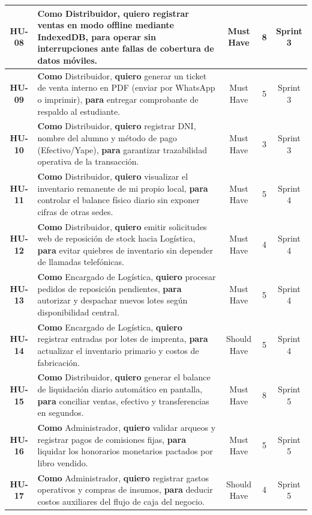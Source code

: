 \begin{xltabular}{\textwidth}{|c|X|c|c|c|}
\hline
\textbf{HU-08} & \textbf{Como} Distribuidor, \textbf{quiero} registrar ventas en modo offline mediante IndexedDB, \textbf{para} operar sin interrupciones ante fallas de cobertura de datos móviles. & Must Have & 8 & Sprint 3 \\
\hline
\textbf{HU-09} & \textbf{Como} Distribuidor, \textbf{quiero} generar un ticket de venta interno en PDF (enviar por WhatsApp o imprimir), \textbf{para} entregar comprobante de respaldo al estudiante. & Must Have & 5 & Sprint 3 \\
\hline
\textbf{HU-10} & \textbf{Como} Distribuidor, \textbf{quiero} registrar DNI, nombre del alumno y método de pago (Efectivo/Yape), \textbf{para} garantizar trazabilidad operativa de la transacción. & Must Have & 3 & Sprint 3 \\
\hline
\textbf{HU-11} & \textbf{Como} Distribuidor, \textbf{quiero} visualizar el inventario remanente de mi propio local, \textbf{para} controlar el balance físico diario sin exponer cifras de otras sedes. & Must Have & 5 & Sprint 4 \\
\hline
\textbf{HU-12} & \textbf{Como} Distribuidor, \textbf{quiero} emitir solicitudes web de reposición de stock hacia Logística, \textbf{para} evitar quiebres de inventario sin depender de llamadas telefónicas. & Must Have & 4 & Sprint 4 \\
\hline
\textbf{HU-13} & \textbf{Como} Encargado de Logística, \textbf{quiero} procesar pedidos de reposición pendientes, \textbf{para} autorizar y despachar nuevos lotes según disponibilidad central. & Must Have & 5 & Sprint 4 \\
\hline
\textbf{HU-14} & \textbf{Como} Encargado de Logística, \textbf{quiero} registrar entradas por lotes de imprenta, \textbf{para} actualizar el inventario primario y costos de fabricación. & Should Have & 5 & Sprint 4 \\
\hline
\textbf{HU-15} & \textbf{Como} Distribuidor, \textbf{quiero} generar el balance de liquidación diario automático en pantalla, \textbf{para} conciliar ventas, efectivo y transferencias en segundos. & Must Have & 8 & Sprint 5 \\
\hline
\textbf{HU-16} & \textbf{Como} Administrador, \textbf{quiero} validar arqueos y registrar pagos de comisiones fijas, \textbf{para} liquidar los honorarios monetarios pactados por libro vendido. & Must Have & 5 & Sprint 5 \\
\hline
\textbf{HU-17} & \textbf{Como} Administrador, \textbf{quiero} registrar gastos operativos y compras de insumos, \textbf{para} deducir costos auxiliares del flujo de caja del negocio. & Should Have & 4 & Sprint 5 \\

\end{xltabular}

